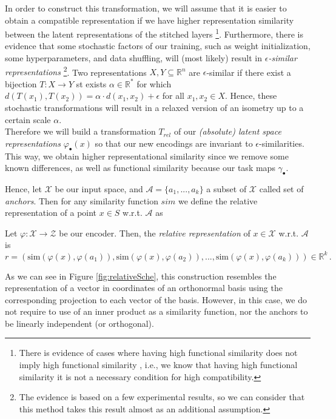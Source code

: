 \documentclass[../main.tex]{subfiles}
\begin{document}
 In order to construct this transformation, we will assume that it is easier to obtain a compatible representation if we have higher representation similarity between the latent representations of the stitched layers \footnote{There is evidence of cases where having high functional similarity does not imply high functional similarity \cite{csiszarik_similarity_2021}, i.e., we know that having high functional similarity it is not a necessary condition for high compatibility.}. Furthermore, there is evidence that some stochastic factors of our training, such as weight initialization, some hyperparameters, and data shuffling, will (most likely) result in \emph{$\epsilon$-similar representations} \cite{moschella_relative_2022} \footnote{The evidence is based on a few experimental results, so we can consider that this method takes this result almost as an additional assumption.}. Two representations $X,Y \subseteq \mathbb{R}^n$ are $\epsilon$-similar if there exist a bijection $T:X \to Y$ st exists $\alpha \in \mathbb{R}^*$ for which $d(T(x_1), T(x_2)) = \alpha \cdot d(x_1,x_2) + \epsilon$ for all $x_1,x_2 \in X$. Hence, these stochastic transformations will result in a relaxed version of an isometry up to a certain scale $\alpha$.\\

 Therefore we will build a transformation $T_{rel}$ of our \emph{(absolute) latent space representations} $\varphi_\bullet(x)$ so that our new encodings are invariant to $\epsilon$-similarities. This way, we obtain higher representational similarity since we remove some known differences, as well as functional similarity because our task maps $\gamma_\bullet$.

 Hence, let $\mathcal{X}$ be our input space, and $\mathcal{A}= \{a_1, ..., a_k\}$ a subset of $\mathcal{X}$ called set of \emph{anchors}. Then for any similarity function $sim$ we define the relative representation of a point $x\in S$  w.r.t. $\mathcal{A}$ as

 \begin{definition}
Let $\varphi:\mathcal{X} \to \mathcal{Z}$ be our encoder. Then, the \emph{relative representation} of $x \in 
 \mathcal{X}$ w.r.t. $\mathcal{A}$ is
\[
r = (\text{sim}(\varphi(x), \varphi(a_1)), \text{sim}(\varphi(x), \varphi(a_2)), ..., \text{sim}(\varphi(x), \varphi(a_k))) \in \mathbb{R}^k\,.
\]
 \end{definition}


\begin{remark}
As we can see in Figure \ref{fig:relativeSche}, this construction resembles the representation of a vector in coordinates of an orthonormal basis using the corresponding projection to each vector of the basis. However, in this case, we do not require to use of an inner product as a similarity function, nor the anchors to be linearly independent (or orthogonal).
\end{remark}
\end{document}
